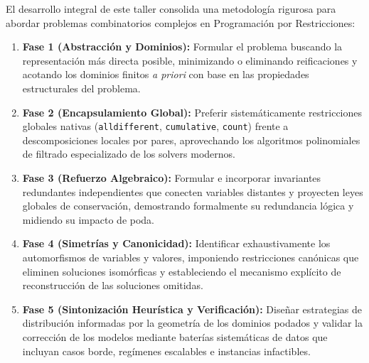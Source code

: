 El desarrollo integral de este taller consolida una metodología rigurosa para abordar problemas combinatorios complejos en Programación por Restricciones:
\begin{enumerate}
    \item \textbf{Fase 1 (Abstracción y Dominios):} Formular el problema buscando la representación más directa posible, minimizando o eliminando reificaciones y acotando los dominios finitos \textit{a priori} con base en las propiedades estructurales del problema.
    \item \textbf{Fase 2 (Encapsulamiento Global):} Preferir sistemáticamente restricciones globales nativas (\texttt{alldifferent}, \texttt{cumulative}, \texttt{count}) frente a descomposiciones locales por pares, aprovechando los algoritmos polinomiales de filtrado especializado de los solvers modernos.
    \item \textbf{Fase 3 (Refuerzo Algebraico):} Formular e incorporar invariantes redundantes independientes que conecten variables distantes y proyecten leyes globales de conservación, demostrando formalmente su redundancia lógica y midiendo su impacto de poda.
    \item \textbf{Fase 4 (Simetrías y Canonicidad):} Identificar exhaustivamente los automorfismos de variables y valores, imponiendo restricciones canónicas que eliminen soluciones isomórficas y estableciendo el mecanismo explícito de reconstrucción de las soluciones omitidas.
    \item \textbf{Fase 5 (Sintonización Heurística y Verificación):} Diseñar estrategias de distribución informadas por la geometría de los dominios podados y validar la corrección de los modelos mediante baterías sistemáticas de datos que incluyan casos borde, regímenes escalables e instancias infactibles.
\end{enumerate}
